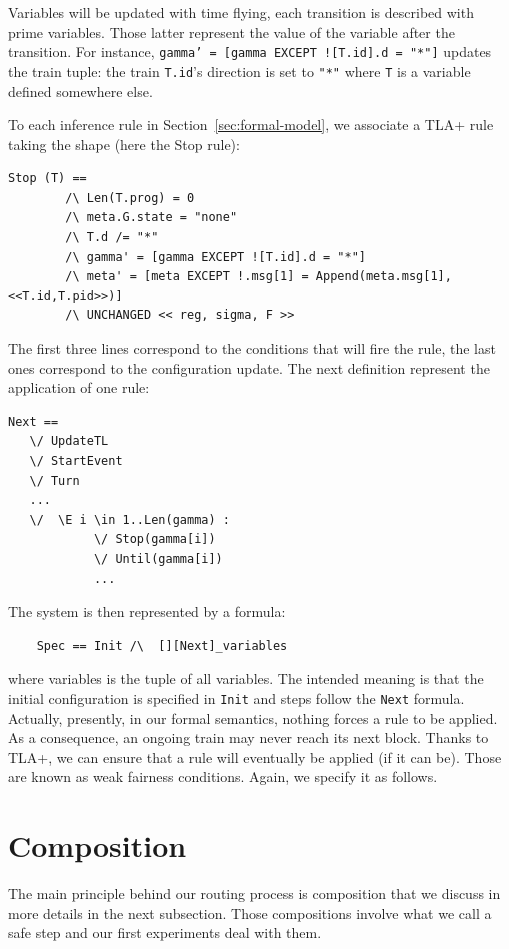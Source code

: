 \documentclass[runningheads]{llncs}
\begin{document}
Variables will be updated with time flying, each transition is described with prime variables. Those latter represent the value of the variable after the transition. For instance, \texttt{gamma' = [gamma EXCEPT ![T.id].d = "*"]} updates the train tuple: the train \texttt{T.id}'s direction is set to \texttt{"*"} where  \texttt{T} is a variable  defined somewhere else. 

To each inference rule in Section~\ref{sec:formal-model}, we associate a TLA+ rule taking the shape (here the Stop rule): 
\begin{verbatim}
Stop (T) ==
        /\ Len(T.prog) = 0
        /\ meta.G.state = "none"
        /\ T.d /= "*"
        /\ gamma' = [gamma EXCEPT ![T.id].d = "*"]
        /\ meta' = [meta EXCEPT !.msg[1] = Append(meta.msg[1],<<T.id,T.pid>>)]
        /\ UNCHANGED << reg, sigma, F >>
 \end{verbatim}
The first three lines correspond to the conditions that will fire the rule, the last ones correspond to the configuration update. The next definition represent the application of one rule:
\begin{verbatim}
Next == 
   \/ UpdateTL
   \/ StartEvent
   \/ Turn
   ...
   \/  \E i \in 1..Len(gamma) :
            \/ Stop(gamma[i])
            \/ Until(gamma[i])
            ...
\end{verbatim}       
        
The system is then represented by a formula:
\begin{verbatim}
    Spec == Init /\  [][Next]_variables
\end{verbatim}%
where variables is the tuple of all variables. The intended meaning is that the initial configuration is specified in \texttt{Init} and steps follow the \texttt{Next} formula.  Actually, presently, in our formal semantics, nothing forces a rule to be applied. As a consequence, an ongoing train may never reach its next block. Thanks to TLA+, we can ensure that a rule will eventually be applied (if it can be). Those are known as weak fairness conditions. Again, we specify it as follows. 


\section{Composition}
\label{sec:composition}

The main principle behind our routing process is composition that we discuss in more details in the next subsection. Those compositions involve what we call a safe step and our first experiments deal with them. 
\end{document}
